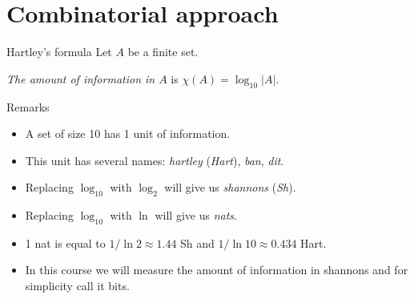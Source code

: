 \documentclass[handout,aspectratio=169]{beamer}
\begin{document}
\section{Combinatorial approach}
\begin{frame}{Hartley's formula}
Let \(A\) be a finite set.
\begin{definition}
     \emph{The amount of information in \(A\)} is \(\chi(A) = \log_{10}|A|\).
\end{definition}

\pause

\begin{block}{Remarks}
\begin{itemize}
    \item A set of size 10 has 1 unit of information.

    \item This unit has several names: \emph{hartley} (\emph{Hart}), \emph{ban}, \emph{dit}.

    \item Replacing $\log_{10}$ with $\log_2$ will give us \emph{shannons} (\emph{Sh}).

    \item Replacing $\log_{10}$ with $\ln$ will give us \emph{nats}.

    \item 1 nat is equal to $1/\ln 2 \approx 1.44$ Sh and $1/\ln 10 \approx 0.434$ Hart.

    \item In this course we will measure the amount of information in shannons and for simplicity call it bits.

\end{itemize}
\end{block}
\end{frame}
\end{document}
